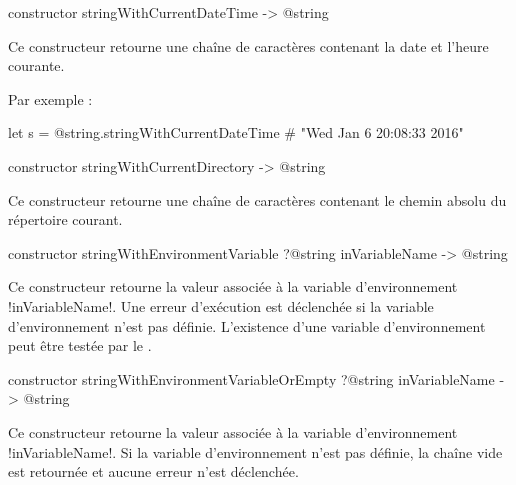 
\begin{galgasbox}
constructor stringWithCurrentDateTime -> @string
\end{galgasbox}

Ce constructeur retourne une chaîne de caractères contenant la date et l'heure courante.

Par exemple :
\begin{galgas}
let s = @string.stringWithCurrentDateTime # "Wed Jan  6 20:08:33 2016"
\end{galgas}








\begin{galgasbox}
constructor stringWithCurrentDirectory -> @string
\end{galgasbox}

Ce constructeur retourne une chaîne de caractères contenant le chemin absolu du répertoire courant.





\begin{galgasbox}
constructor stringWithEnvironmentVariable
  ?@string inVariableName
  -> @string
\end{galgasbox}

Ce constructeur retourne la valeur associée à la variable d'environnement \ggs!inVariableName!. Une erreur d'exécution est déclenchée si la variable d'environnement n'est pas définie. L'existence d'une variable d'environnement peut être testée par le .






\begin{galgasbox}
constructor stringWithEnvironmentVariableOrEmpty
  ?@string inVariableName
  -> @string
\end{galgasbox}

Ce constructeur retourne la valeur associée à la variable d'environnement \ggs!inVariableName!. Si la variable d'environnement n'est pas définie, la chaîne vide est retournée et aucune erreur n'est déclenchée.






